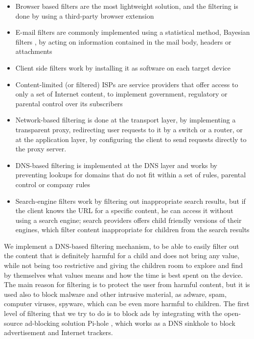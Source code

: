\begin{itemize}
\item Browser based filters are the most lightweight solution, and the filtering is done by using a third-party browser extension
\item E-mail filters are commonly implemented using a statistical method, Bayesian filters \citep{sahami1998bayesian}, by acting on information contained in the mail body, headers or attachments
\item Client side filters work by installing it as software on each target device
\item Content-limited (or filtered) ISPs are service providers that offer access to only a set of Internet content, to implement government, regulatory or parental control over its subscribers
\item Network-based filtering is done at the transport layer, by implementing a transparent proxy, redirecting user requests to it by a switch or a router, or at the application layer, by configuring the client to send requests directly to the proxy server. \parencite{contentGateway}
\item DNS-based filtering \citep{sarvepalli2017dns} is implemented at the DNS layer and works by preventing lookups for domains that do not fit within a set of rules, parental control or company rules
\item Search-engine filters work by filtering out inappropriate search results, but if the client knows the URL for a specific content, he can access it without using a search engine; search providers offers child friendly versions of their engines, which filter content inappropriate for children from the search results
\end{itemize}

We implement a DNS-based filtering mechanism, to be able to easily filter out the content that is definitely harmful for a child and does not bring any value, while not being too restrictive and giving the children room to explore and find by themselves what values means and how the time is best spent on the device. The main reason for filtering is to protect the user from harmful content, but it is used also to block malware and other intrusive material, as adware, spam, computer viruses, spyware, which can be even more harmful to children. The first level of filtering that we try to do is to block ads by integrating with the open-source ad-blocking solution Pi-hole \citep{pot2015adblock}, which works as a DNS sinkhole to block advertisement and Internet trackers.


